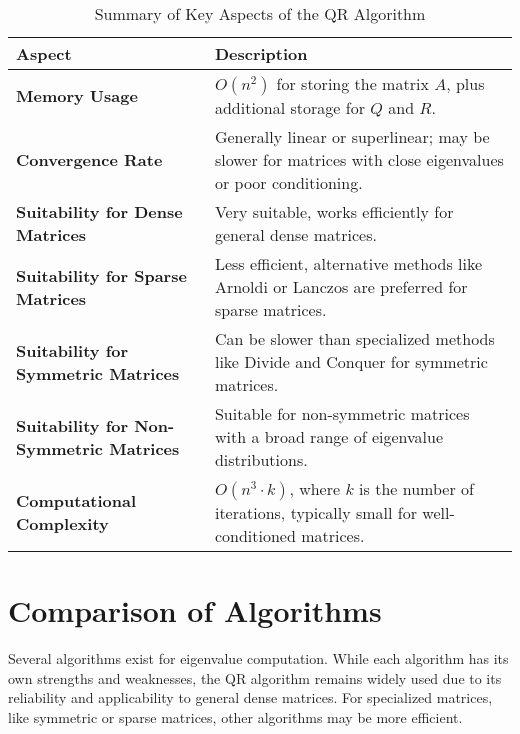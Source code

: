 \documentclass[a4paper,12pt]{report}
\begin{document}
\begin{table}[H]
\centering
\begin{tabular}{|p{3cm}|p{9cm}|}
\hline
\textbf{Aspect}              & \textbf{Description}                                                                                  \\ \hline
\textbf{Memory Usage}         & \( O(n^2) \) for storing the matrix \( A \), plus additional storage for \( Q \) and \( R \).        \\ \hline
\textbf{Convergence Rate}     & Generally linear or superlinear; may be slower for matrices with close eigenvalues or poor conditioning. \\ \hline
\textbf{Suitability for Dense Matrices} & Very suitable, works efficiently for general dense matrices.                                      \\ \hline
\textbf{Suitability for Sparse Matrices} & Less efficient, alternative methods like Arnoldi or Lanczos are preferred for sparse matrices.    \\ \hline
\textbf{Suitability for Symmetric Matrices} & Can be slower than specialized methods like Divide and Conquer for symmetric matrices.            \\ \hline
\textbf{Suitability for Non-Symmetric Matrices} & Suitable for non-symmetric matrices with a broad range of eigenvalue distributions.             \\ \hline
\textbf{Computational Complexity} & \( O(n^3 \cdot k) \), where \( k \) is the number of iterations, typically small for well-conditioned matrices. \\ \hline
\end{tabular}
\caption{Summary of Key Aspects of the QR Algorithm}
\end{table}

\section*{\textcolor{myblue}{Comparison of Algorithms}}

Several algorithms exist for eigenvalue computation. While each algorithm has its own strengths and weaknesses, the QR algorithm remains widely used due to its reliability and applicability to general dense matrices. For specialized matrices, like symmetric or sparse matrices, other algorithms may be more efficient.
\end{document}
